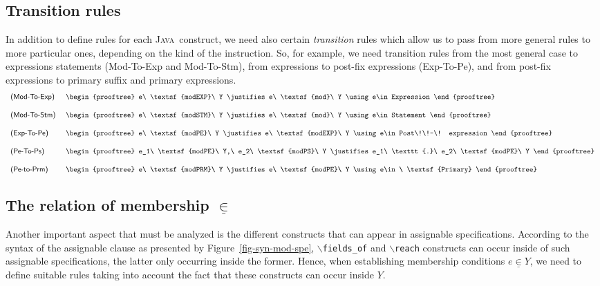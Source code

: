 \documentclass[a4paper]{llncs}
\newcommand{\java}{\textsc{Java}}
\begin{document}
\subsection{Transition rules}
\label{sub-sec-tra-rul}
In addition to define rules for each \java~construct, we need also
certain \emph{transition} rules which allow us to pass from more
general rules to more particular ones, depending on the kind of the
instruction. So, for example, we need transition rules from the most
general case to expressions statements (\textsf{Mod-To-Exp} and
\textsf{Mod-To-Stm}), from expressions to post-fix expressions
(\textsf{Exp-To-Pe}), and from post-fix expressions to primary suffix
and primary expressions.
\[
\begin{tabular}{ll}
\textsf{(Mod-To-Exp)}\,\, & 
\begin{prooftree}
e\ \textsf{modEXP}\ Y
\justifies
e\ \textsf{mod}\ Y
\using
e\in Expression
\end{prooftree}
\\[3.0ex]
\textsf{(Mod-To-Stm)} & 
\begin{prooftree}
e\ \textsf{modSTM}\ Y
\justifies
e\ \textsf{mod}\ Y
\using
e\in Statement
\end{prooftree}
\\[3.0ex]
\textsf{(Exp-To-Pe)}\,\, & 
\begin{prooftree}
e\ \textsf{modPE}\ Y
\justifies
e\ \textsf{modEXP}\ Y
\using
e\in Post\!\!-\! expression
\end{prooftree}
\\[3.0ex]
\textsf{(Pe-To-Ps)} &
\begin{prooftree}
e_1\ \textsf{modPE}\ Y,\ e_2\ \textsf{modPS}\ Y
\justifies
e_1\ \texttt{.}\ e_2\ \textsf{modPE}\ Y
\end{prooftree}
\\[3.0ex]
\textsf{(Pe-to-Prm)} &
\begin{prooftree}
e\ \textsf{modPRM}\ Y
\justifies
e\ \textsf{modPE}\ Y
\using
e\in \ \textsf{Primary}
\end{prooftree}
\end{tabular}
\]




\subsection{The relation of membership $\underline{\in}$}
\label{sub-sec-the-rel-mem}
Another important aspect that must be analyzed is
the different constructs that can appear in assignable
specifications. According to the syntax of the assignable clause as
presented by Figure~\ref{fig-syn-mod-spe},
\texttt{$\backslash$fields\_of} and \texttt{$\backslash$reach}
constructs can occur inside of such assignable specifications, the
latter only occurring inside the former. Hence, when establishing
membership conditions $e\underline\in Y$, we need to define suitable
rules taking into account the fact that these constructs can occur
inside $Y$.
\end{document}
